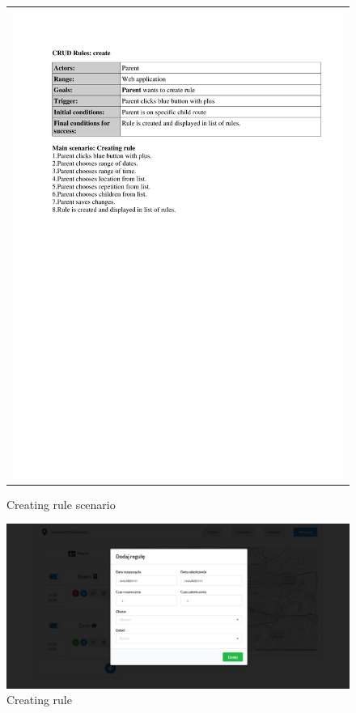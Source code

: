 \documentclass{sprawozdanie-agh}
\begin{document}
		\begin{figure}[H] 
			\centering
			\begin{tabular}{c}
				\includegraphics[width=.80\textwidth]{rulesCreate} 
			\end{tabular} 
		\caption{Creating rule scenario}
		\end{figure}

		\begin{figure}[H]
			\centering
			\includegraphics[width=.80\textwidth]{addRule}
			\caption{Creating rule}
		\end{figure}
\end{document}
